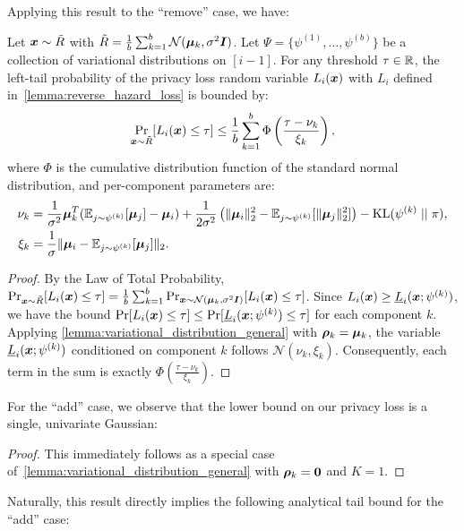 Applying this result to the ``remove'' case, we have:
\begin{theorem}\label{thm:remove_tail_bound}
    Let ${\bm{x}} \sim \tilde{R}$ with $\tilde{R} = \frac{1}{b} \sum_{k=1}^b \mathcal{N}({\bm{\mu}}_k, \sigma^2 {\bm{I}})$.
    Let $\Psi = \{\psi^{(1)}, \dots, \psi^{(b)}\}$ be a collection of variational distributions on $[i-1]$.
    For any threshold $\tau \in {\mathbb{R}}$, the left-tail probability of the privacy loss random variable 
    $L_i({\bm{x}})$ with $L_i$ defined in~\cref{lemma:reverse_hazard_loss} is bounded by:
    \begin{equation}
        \Pr_{{\bm{x}} \sim \tilde{R}}[L_i({\bm{x}}) \leq \tau] \leq \frac{1}{b} \sum_{k=1}^b \Phi\left( \frac{\tau - \nu_k}{\xi_k} \right),
    \end{equation}
    where $\Phi$ is the cumulative distribution function of the standard normal distribution, and per-component parameters are:
    \begin{align*}
        \nu_k &= \frac{1}{\sigma^2} {\bm{\mu}}_k^T (\mathbb{E}_{j \sim \psi^{(k)}}[{\bm{\mu}}_j] - {\bm{\mu}}_i) + \frac{1}{2\sigma^2} \left( \|{\bm{\mu}}_i\|_2^2 - \mathbb{E}_{j \sim \psi^{(k)}}[\|{\bm{\mu}}_j\|_2^2] \right) - \mathrm{KL}(\psi^{(k)} \mid\mid \pi), \\
        \xi_k &= \frac{1}{\sigma} \| {\bm{\mu}}_i - \mathbb{E}_{j \sim \psi^{(k)}}[{\bm{\mu}}_j] \|_2.
    \end{align*}
\end{theorem}
\begin{proof}
    By the Law of Total Probability, $\Pr_{{\bm{x}} \sim \tilde{R}}[L_i({\bm{x}}) \leq \tau] = \frac{1}{b} \sum_{k=1}^b \Pr_{{\bm{x}} \sim \mathcal{N}({\bm{\mu}}_k, \sigma^2 {\bm{I}})} [L_i({\bm{x}}) \leq \tau]$.
    Since $L_i({\bm{x}}) \geq \underline{L}_i({\bm{x}}; \psi^{(k)})$, we have the bound
    $\Pr[L_i({\bm{x}}) \leq \tau] \leq \Pr[\underline{L}_i({\bm{x}}; \psi^{(k)}) \leq \tau]$ for each component $k$.
    Applying \cref{lemma:variational_distribution_general} with ${\bm{\rho}}_k = {\bm{\mu}}_k$, the variable $\underline{L}_i({\bm{x}}; \psi^{(k)})$ conditioned on component $k$ follows $\mathcal{N}(\nu_k, \xi_k)$.
    Consequently, each term in the sum is exactly $\Phi\left( \frac{\tau - \nu_k}{\xi_k} \right)$.
\end{proof}
For the ``add'' case, we observe that the lower bound on our privacy loss is a single, univariate Gaussian:
\variationalboundadd*
\begin{proof}
    This immediately follows as a special case of~\cref{lemma:variational_distribution_general} with ${\bm{\rho}}_k = {\bm{0}}$ and $K=1$.
\end{proof}
Naturally, this result directly implies the following analytical tail bound for the ``add'' case:
